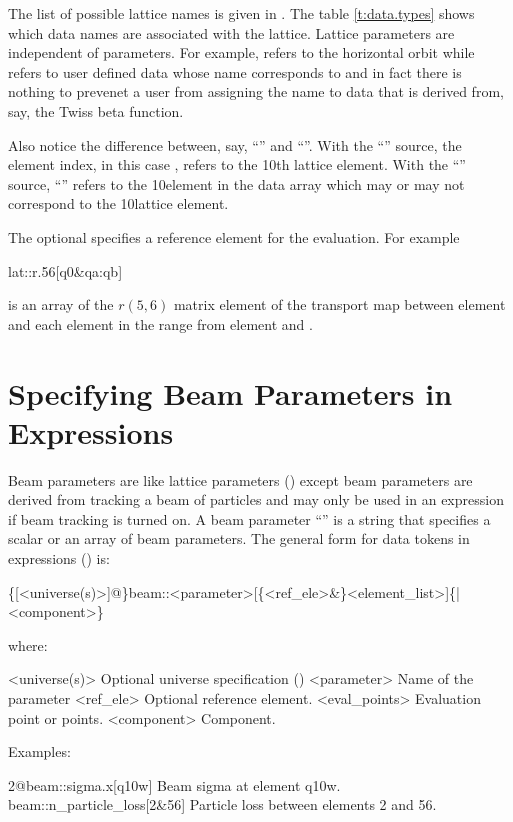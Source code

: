 The list of possible lattice  names is given in . The
table \ref{t:data.types} shows which data names are associated with the lattice. Lattice
parameters are independent of  parameters. For example,  refers
to the horizontal orbit while  refers to user defined data whose name
corresponds to  and in fact there is nothing to prevenet a user from assigning
the name  to data that is derived from, say, the Twiss beta function.

Also notice the difference between, say, ``'' and
``''. With the ``'' source, the element index, in this
case , refers to the 10th lattice element. With the ``'' source,
``'' refers to the 10\Th element in the  data array which may or may
not correspond to the 10\Th lattice element.

The optional  specifies a reference
element for the evaluation. For example
\begin{example}
  lat::r.56[q0\&qa:qb]
\end{example}  
is an array of the $r(5,6)$ matrix element of the transport map
between element  and each element in the range from element
 and . 

\section{Specifying Beam Parameters in Expressions}
\label{s:beam.token}

Beam parameters are like lattice parameters () except beam parameters
are derived from tracking a beam of particles and may only be used in an expression if beam
tracking is turned on.  A beam parameter ``'' is a string that specifies a scalar or an
array of beam parameters. The general form for data tokens in expressions
() is:
\begin{example}
  \{[<universe(s)>]@\}beam::<parameter>[\{<ref_ele>&\}<element_list>]\{|<component>\}
\end{example}
where:
\begin{example}
  <universe(s)>       Optional universe specification ()
  <parameter>         Name of the parameter
  <ref_ele>           Optional reference element.
  <eval_points>       Evaluation point or points.
  <component>         Component. 
\end{example}
Examples:
\begin{example}
  2@beam::sigma.x[q10w]           Beam sigma at element q10w.
  beam::n_particle_loss[2&56]     Particle loss between elements 2 and 56.
\end{example}


